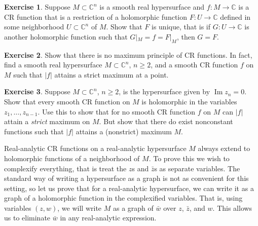 \documentclass[12pt,openany]{book}
\renewcommand{\Im}{\operatorname{Im}}
\newcommand{\sabs}[1]{\lvert {#1} \rvert}
\newcommand{\C}{{\mathbb{C}}}
\theoremstyle{plain}
\theoremstyle{remark}
\theoremstyle{definition}
\newenvironment{exbox}{%
    \def\FrameCommand{\vrule width 1pt \relax\hspace{10pt}}%
    \MakeFramed{\advance\hsize-\width\FrameRestore}%
}{%
    \endMakeFramed
}
\theoremstyle{exercise}
\newtheorem{exercise}{Exercise}[section]
\theoremstyle{example}
\begin{document}
\begin{exbox}
\begin{exercise}
Suppose $M \subset \C^n$ is a smooth real hypersurface
and $f \colon M \to \C$ is a CR function that is a restriction
of a holomorphic function $F \colon U \to \C$ defined in
some neighborhood $U \subset \C^n$ of $M$.  Show that $F$ is unique,
that is if $G \colon U \to \C$ is another holomorphic function such that
$G|_M = f = F|_M$, then $G=F$.
\end{exercise}

\begin{exercise}
Show that there is no maximum principle of CR functions.  In fact, find a
smooth real hypersurface $M \subset \C^n$, $n \geq 2$, and a smooth CR function
$f$ on $M$ such that $\sabs{f}$ attains a strict maximum at a point.
\end{exercise}

\begin{exercise}
Suppose $M \subset \C^n$, $n \geq 2$, is the hypersurface given by $\Im z_n
= 0$.  Show that every smooth CR function on $M$ is holomorphic in the variables
$z_1,\ldots,z_{n-1}$.  Use this to show that for no smooth CR function $f$ on $M$ can
$\sabs{f}$ attain a \emph{strict} maximum on $M$.  But show that there do
exist nonconstant functions such that $\sabs{f}$ attains a (nonstrict) maximum $M$.
\end{exercise}
\end{exbox}

Real-analytic CR functions on a real-analytic
hypersurface $M$ always extend to holomorphic functions of a neighborhood of $M$.
To prove this we wish to complexify everything, that is treat the
$z$s and $\bar{z}$s as separate variables.  The standard way of
writing a hypersurface as a graph is not as convenient for this setting, so
let us prove that for a real-analytic hypersurface, we can write it as a
graph of a holomorphic function in the complexified variables.  That is,
using variables $(z,w)$,
we will write $M$ as a graph of $\bar{w}$ over $z$, $\bar{z}$, and $w$.
This allows us to eliminate $\bar{w}$ in any real-analytic
expression.
\end{document}
